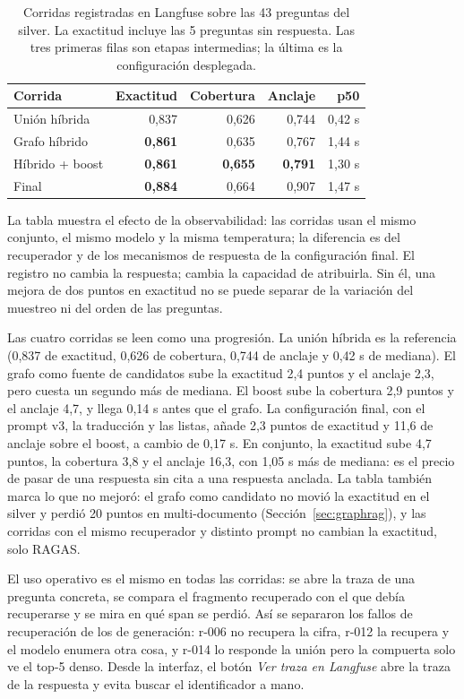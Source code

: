\begin{table}[t]
\centering
\footnotesize
\caption{Corridas registradas en Langfuse sobre las 43 preguntas del silver. La exactitud incluye las 5 preguntas sin respuesta. Las tres primeras filas son etapas intermedias; la \'ultima es la configuraci\'on desplegada.}
\label{tab:observabilidad}
\begin{tabular}{lrrrr}
\toprule
Corrida & Exactitud & Cobertura & Anclaje & p50 \\
\midrule
Uni\'on h\'ibrida & 0,837 & 0,626 & 0,744 & 0,42 s \\
Grafo h\'ibrido & \textbf{0,861} & 0,635 & 0,767 & 1,44 s \\
H\'ibrido + boost & \textbf{0,861} & \textbf{0,655} & \textbf{0,791} & 1,30 s \\
Final & \textbf{0,884} & 0,664 & 0,907 & 1,47 s \\
\bottomrule
\end{tabular}
\end{table}

La tabla muestra el efecto de la observabilidad: las corridas usan el mismo conjunto, el mismo modelo y la misma temperatura; la diferencia es del recuperador y de los mecanismos de respuesta de la configuraci\'on final. El registro no cambia la respuesta; cambia la capacidad de atribuirla. Sin \'el, una mejora de dos puntos en exactitud no se puede separar de la variaci\'on del muestreo ni del orden de las preguntas.

Las cuatro corridas se leen como una progresi\'on. La uni\'on h\'ibrida es la referencia (0,837 de exactitud, 0,626 de cobertura, 0,744 de anclaje y 0,42 s de mediana). El grafo como fuente de candidatos sube la exactitud 2,4 puntos y el anclaje 2,3, pero cuesta un segundo m\'as de mediana. El boost sube la cobertura 2,9 puntos y el anclaje 4,7, y llega 0,14 s antes que el grafo. La configuraci\'on final, con el prompt v3, la traducci\'on y las listas, a\~nade 2,3 puntos de exactitud y 11,6 de anclaje sobre el boost, a cambio de 0,17 s. En conjunto, la exactitud sube 4,7 puntos, la cobertura 3,8 y el anclaje 16,3, con 1,05 s m\'as de mediana: es el precio de pasar de una respuesta sin cita a una respuesta anclada. La tabla tambi\'en marca lo que no mejor\'o: el grafo como candidato no movi\'o la exactitud en el silver y perdi\'o 20 puntos en multi-documento (Secci\'on~\ref{sec:graphrag}), y las corridas con el mismo recuperador y distinto prompt no cambian la exactitud, solo RAGAS.

El uso operativo es el mismo en todas las corridas: se abre la traza de una pregunta concreta, se compara el fragmento recuperado con el que deb\'ia recuperarse y se mira en qu\'e span se perdi\'o. As\'i se separaron los fallos de recuperaci\'on de los de generaci\'on: r-006 no recupera la cifra, r-012 la recupera y el modelo enumera otra cosa, y r-014 lo responde la uni\'on pero la compuerta solo ve el top-5 denso. Desde la interfaz, el bot\'on \textit{Ver traza en Langfuse} abre la traza de la respuesta y evita buscar el identificador a mano.

